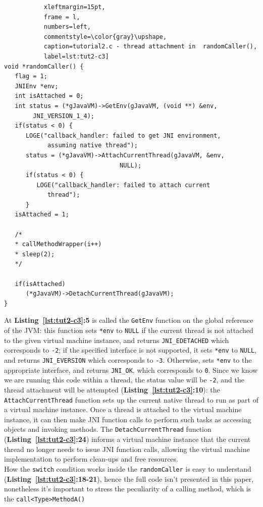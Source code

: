 \documentclass[a4paper,10pt]{article}
\newcommand{\keyword}[1]{\texttt{#1}}
\newcommand{\refl}[1]{\textbf{Listing~\ref{#1}}}
\begin{document}
\begin{multicols}{2}
\begin{lstlisting}
		   xleftmargin=15pt,
		   frame = l,
		   numbers=left,
		   commentstyle=\color{gray}\upshape,
		   caption=tutorial2.c - thread attachment in  randomCaller(),
		   label=lst:tut2-c3]
void *randomCaller() {
   flag = 1;
   JNIEnv *env;
   int isAttached = 0;				   
   int status = (*gJavaVM)->GetEnv(gJavaVM, (void **) &env,
		JNI_VERSION_1_4);
   if(status < 0) {
      LOGE("callback_handler: failed to get JNI environment,
      		assuming native thread");
      status = (*gJavaVM)->AttachCurrentThread(gJavaVM, &env,
      							NULL);
      if(status < 0) {
         LOGE("callback_handler: failed to attach current
         	thread");
      }
   isAttached = 1;

   /*
   * callMethodWrapper(i++) 
   * sleep(2);   
   */
   
   if(isAttached)
      (*gJavaVM)->DetachCurrentThread(gJavaVM);
}
\end{lstlisting}
At \refl{lst:tut2-c3}\textbf{:5} is called the \keyword{GetEnv} function on the
global reference of the JVM: this function sets \keyword{*env} to \keyword{NULL}
if the current thread is not attached to the given virtual machine instance, and
returns \keyword{JNI\_EDETACHED} which corresponds to \keyword{-2}; if the
specified interface is not supported, it sets \keyword{*env} to \keyword{NULL},
and returns \keyword{JNI\_EVERSION} which corresponds to \keyword{-3}. Otherwise,
sets \keyword{*env} to the appropriate interface, and returns \keyword{JNI\_OK},
which corresponds to \keyword{0}. Since we know we are running this code within
a thread, the status value will be \keyword{-2}, and the thread attachment will
be attempted (\refl{lst:tut2-c3}\textbf{:10}): the \keyword{AttachCurrentThread}
function sets up the current native thread to run as part of a virtual machine
instance. Once a thread is attached to the virtual machine instance, it can then
make JNI function calls to perform such tasks as accessing objects and invoking
methods. The \keyword{DetachCurrentThread} function
(\refl{lst:tut2-c3}\textbf{:24}) informs a virtual machine instance that the
current thread no longer needs to issue JNI function calls, allowing the virtual
machine implementation to perform clean-ups and free resources.\\
How the \keyword{switch} condition works inside the \keyword{randomCaller} is
easy to understand (\refl{lst:tut2-c3}\textbf{:18-21}), hence the full code
isn't presented in this paper, nonetheless it's important to stress the
peculiarity of a calling method, which is the \keyword{call<Type>MethodA()}

\end{multicols}
\end{document}
